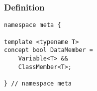 
\subsubsection{Definition}

\begin{verbatim}
namespace meta {

template <typename T>
concept bool DataMember =
	Variable<T> &&
	ClassMember<T>;

} // namespace meta
\end{verbatim}
